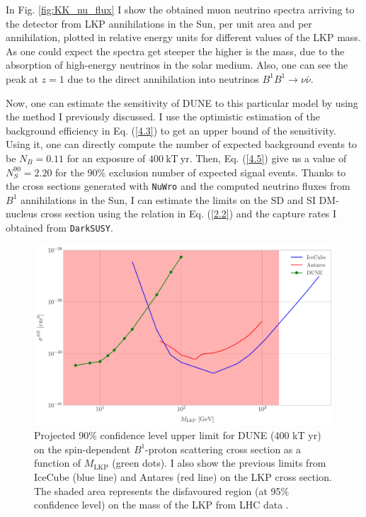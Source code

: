 In Fig. \ref{fig:KK_nu_flux} I show the obtained muon neutrino spectra arriving to the detector from LKP annihilations in the Sun, per unit area and per annihilation, plotted in relative energy units for different values of the LKP mass. As one could expect the spectra get steeper the higher is the mass, due to the absorption of high-energy neutrinos in the solar medium. Also, one can see  the peak at $z=1$ due to the direct annihilation into neutrinos $B^{1} B^{1} \rightarrow \nu \bar{\nu}$.

Now, one can estimate the sensitivity of DUNE to this particular model by using the method I previously discussed. I use the optimistic estimation of the background efficiency in Eq. (\ref{4.3}) to get an upper bound of the sensitivity. Using it, one can directly compute the number of expected background events to be $N_{B} = 0.11$ for an exposure of $400 \ \mathrm{kT}  \ \mathrm{yr}$. Then, Eq. (\ref{4.5}) give us a value of $N_{S}^{90} = 2.20$ for the $90\%$ exclusion number of expected signal events. Thanks to the cross sections generated with \texttt{NuWro} and the computed neutrino fluxes from $B^{1}$ annihilations in the Sun, I can estimate the limits on the SD and SI DM-nucleus cross section using the relation in Eq. (\ref{2.2}) and the capture rates I obtained from \texttt{DarkSUSY}.

\begin{figure}[t]
	\centering
	\includegraphics[width=0.9\linewidth]{Images/DM_Analysis/kk_xsection_sd_bounds}
	\caption[Projected 90\% confidence level upper limit for DUNE (400 kT yr) on the spin-dependent $B^{1}$-proton scattering cross section as a function of $M_{\mathrm{LKP}}$.]{Projected 90\% confidence level upper limit for DUNE (400 kT yr) on the spin-dependent $B^{1}$-proton scattering cross section as a function of $M_{\mathrm{LKP}}$ (green dots). I also show the previous limits from IceCube \cite{Bernadich2019} (blue line) and Antares \cite{Zornoza2012} (red line) on the LKP cross section. The shaded area represents the disfavoured region (at 95\% confidence level) on the mass of the LKP from LHC data \cite{Deutschmann2017}.}
	\label{fig:kk_xsection_sd_bounds}
\end{figure}


